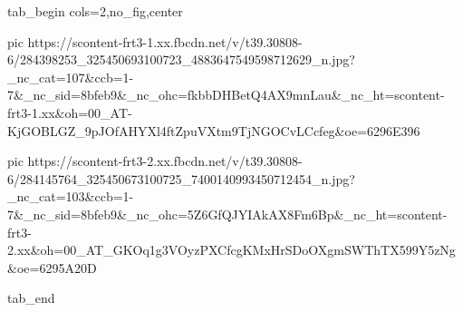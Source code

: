  
 
 
 
 

\ifcmt
  tab_begin cols=2,no_fig,center

     pic https://scontent-frt3-1.xx.fbcdn.net/v/t39.30808-6/284398253_325450693100723_4883647549598712629_n.jpg?_nc_cat=107&ccb=1-7&_nc_sid=8bfeb9&_nc_ohc=fkbbDHBetQ4AX9mnLau&_nc_ht=scontent-frt3-1.xx&oh=00_AT-KjGOBLGZ_9pJOfAHYXl4ftZpuVXtm9TjNGOCvLCcfeg&oe=6296E396

     pic https://scontent-frt3-2.xx.fbcdn.net/v/t39.30808-6/284145764_325450673100725_7400140993450712454_n.jpg?_nc_cat=103&ccb=1-7&_nc_sid=8bfeb9&_nc_ohc=5Z6GfQJYIAkAX8Fm6Bp&_nc_ht=scontent-frt3-2.xx&oh=00_AT_GKOq1g3VOyzPXCfcgKMxHrSDoOXgmSWThTX599Y5zNg&oe=6295A20D

  tab_end
\fi
